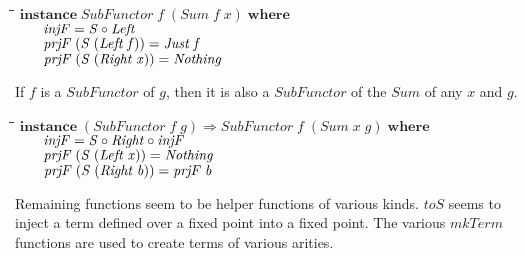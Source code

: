 \documentclass[10pt]{article}
\newlength{\lwidth}\setlength{\lwidth}{4.5cm}
\newlength{\cwidth}\setlength{\cwidth}{8mm} %
\newcommand{\Conid}[1]{\mathit{#1}}
\newcommand{\Varid}[1]{\mathit{#1}}
\begin{document}
\begin{tabbing}
\qquad\=\hspace{\lwidth}\=\hspace{\cwidth}\=\+\kill
${\mathbf{instance}\;\Conid{SubFunctor}\;\Varid{f}\;(\Conid{Sum}\;\Varid{f}\;\Varid{x})\;\mathbf{where}}$\\
${\hskip2.00em\relax\Varid{injF}\mathrel{=}\Conid{S}\mathbin{\circ}\Conid{Left}}$\\
${\hskip2.00em\relax\Varid{prjF}\;(\Conid{S}\;(\Conid{Left}\;\Varid{f}))\mathrel{=}\Conid{Just}\;\Varid{f}}$\\
${\hskip2.00em\relax\Varid{prjF}\;(\Conid{S}\;(\Conid{Right}\;\Varid{x}))\mathrel{=}\Conid{Nothing}}$
\end{tabbing}
If \ensuremath{\Varid{f}} is a \ensuremath{\Conid{SubFunctor}} of \ensuremath{\Varid{g}}, then it is also a \ensuremath{\Conid{SubFunctor}} of the
\ensuremath{\Conid{Sum}} of any \ensuremath{\Varid{x}} and \ensuremath{\Varid{g}}.

\begin{tabbing}
\qquad\=\hspace{\lwidth}\=\hspace{\cwidth}\=\+\kill
${\mathbf{instance}\;(\Conid{SubFunctor}\;\Varid{f}\;\Varid{g})\Rightarrow \Conid{SubFunctor}\;\Varid{f}\;(\Conid{Sum}\;\Varid{x}\;\Varid{g})\;\mathbf{where}}$\\
${\hskip2.00em\relax\Varid{injF}\mathrel{=}\Conid{S}\mathbin{\circ}\Conid{Right}\mathbin{\circ}\Varid{injF}}$\\
${\hskip2.00em\relax\Varid{prjF}\;(\Conid{S}\;(\Conid{Left}\;\Varid{x}))\mathrel{=}\Conid{Nothing}}$\\
${\hskip2.00em\relax\Varid{prjF}\;(\Conid{S}\;(\Conid{Right}\;\Varid{b}))\mathrel{=}\Varid{prjF}\;\Varid{b}}$
\end{tabbing}
Remaining functions seem to be helper functions of various kinds.
\ensuremath{\Varid{toS}} seems to inject a term defined over a fixed point into a fixed
point.  The various \ensuremath{\Varid{mkTerm}} functions are used to create terms of
various arities.
\end{document}

